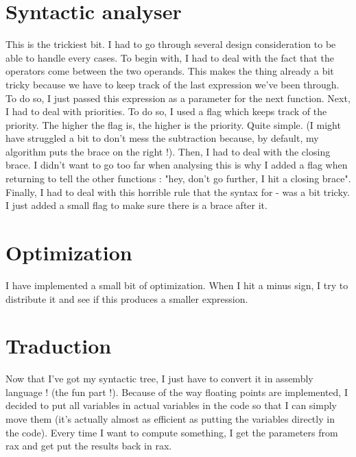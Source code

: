 \documentclass[12pt,a4paper]{article}
\begin{document}
\section{Syntactic analyser}
This is the trickiest bit. I had to go through several design consideration to be able to handle every cases.
To begin with, I had to deal with the fact that the operators come between the two operands. This makes the thing already a bit tricky because we have to keep track of the last expression we've been through. To do so, I just passed this expression as a parameter for the next function.
Next, I had to deal with priorities. To do so, I used a flag which keeps track of the priority. The higher the flag is, the higher is the priority. Quite simple. (I might have struggled a bit to don't mess the subtraction because, by default, my algorithm puts the brace on the right !).
Then, I had to deal with the closing brace. I didn't want to go too far when analysing this is why I added a flag when returning to tell the other functions : "hey, don't go further, I hit a closing brace".
Finally, I had to deal with this horrible rule that the syntax for - was a bit tricky. I just added a small flag to make sure there is a brace after it.

\section{Optimization}
I have implemented a small bit of optimization. When I hit a minus sign, I try to distribute it and see if this produces a smaller expression.

\section{Traduction}
Now that I've got my syntactic tree, I just have to convert it in assembly language ! (the fun part !).
Because of the way floating points are implemented, I decided to put all variables in actual variables in the code so that I can simply move them (it's actually almost as efficient as putting the variables directly in the code).
Every time I want to compute something, I get the parameters from rax and get put the results back in rax.
\end{document}
